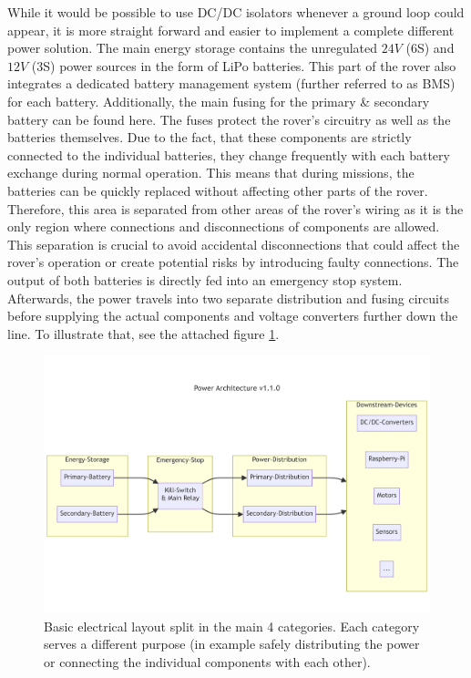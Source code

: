    While it would be possible to use DC/DC isolators whenever a ground loop could appear, it is more straight forward and easier to implement a complete different power solution. The main energy storage contains the unregulated $24V$ (6S) and $12V$ (3S) power sources in the form of LiPo batteries. This part of the rover also integrates a dedicated battery management system (further referred to as BMS) for each battery. Additionally, the main fusing for the primary \& secondary battery can be found here. The fuses protect the rover's circuitry as well as the batteries themselves. Due to the fact, that these components are strictly connected to the individual batteries, they change frequently with each battery exchange during normal operation. This means that during missions, the batteries can be quickly replaced without affecting other parts of the rover. Therefore, this area is separated from other areas of the rover's wiring as it is the only region where connections and disconnections of components are allowed. This separation is crucial to avoid accidental disconnections that could affect the rover's operation or create potential risks by introducing faulty connections. The output of both batteries is directly fed into an emergency stop system. Afterwards, the power travels into two separate distribution and fusing circuits before supplying the actual components and voltage converters further down the line. To illustrate that, see the attached figure \ref{fig:power_architecture}.
    
    \begin{figure}[h] %
        \includegraphics[width=\textwidth]{contents/figures/power-architecture-v1.1.0.png}
        \caption{Basic electrical layout split in the main 4 categories. Each category serves a different purpose (in example safely distributing the power or connecting the individual components with each other).}
         \label{fig:power_architecture}
    \end{figure}

